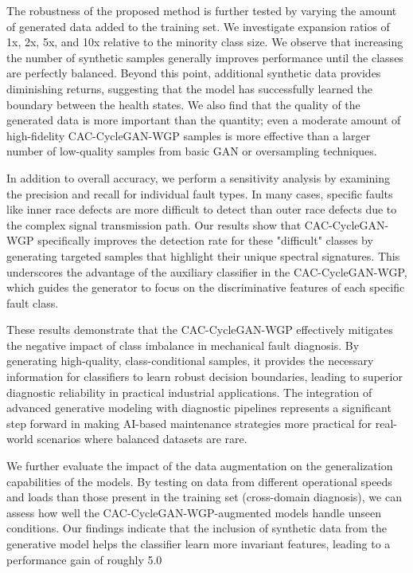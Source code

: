 \documentclass[conference,twocolumn]{IEEEtran}
\begin{document}
The robustness of the proposed method is further tested by varying the amount of generated data added to the training set. We investigate expansion ratios of 1x, 2x, 5x, and 10x relative to the minority class size. We observe that increasing the number of synthetic samples generally improves performance until the classes are perfectly balanced. Beyond this point, additional synthetic data provides diminishing returns, suggesting that the model has successfully learned the boundary between the health states. We also find that the quality of the generated data is more important than the quantity; even a moderate amount of high-fidelity CAC-CycleGAN-WGP samples is more effective than a larger number of low-quality samples from basic GAN or oversampling techniques.

In addition to overall accuracy, we perform a sensitivity analysis by examining the precision and recall for individual fault types. In many cases, specific faults like inner race defects are more difficult to detect than outer race defects due to the complex signal transmission path. Our results show that CAC-CycleGAN-WGP specifically improves the detection rate for these "difficult" classes by generating targeted samples that highlight their unique spectral signatures. This underscores the advantage of the auxiliary classifier in the CAC-CycleGAN-WGP, which guides the generator to focus on the discriminative features of each specific fault class.

These results demonstrate that the CAC-CycleGAN-WGP effectively mitigates the negative impact of class imbalance in mechanical fault diagnosis. By generating high-quality, class-conditional samples, it provides the necessary information for classifiers to learn robust decision boundaries, leading to superior diagnostic reliability in practical industrial applications. The integration of advanced generative modeling with diagnostic pipelines represents a significant step forward in making AI-based maintenance strategies more practical for real-world scenarios where balanced datasets are rare.


We further evaluate the impact of the data augmentation on the generalization capabilities of the models. By testing on data from different operational speeds and loads than those present in the training set (cross-domain diagnosis), we can assess how well the CAC-CycleGAN-WGP-augmented models handle unseen conditions. Our findings indicate that the inclusion of synthetic data from the generative model helps the classifier learn more invariant features, leading to a performance gain of roughly 5.0%
\end{document}
